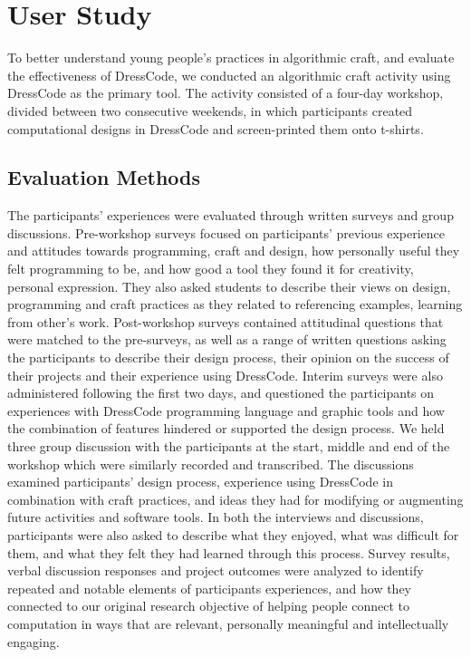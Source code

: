 \documentclass{sigchi}
\begin{document}
\section{User Study}
To better understand young people's practices in algorithmic craft, and evaluate the effectiveness of DressCode, we conducted an algorithmic craft activity using DressCode as the primary tool. The activity consisted of a four-day workshop, divided between two consecutive weekends, in which participants created computational designs in DressCode and screen-printed them onto t-shirts.

\subsection{Evaluation Methods}
The participants' experiences were evaluated through written surveys and group discussions. Pre-workshop surveys focused on participants' previous experience and attitudes towards programming, craft and design, how personally useful they felt programming to be, and how good a tool they found it for creativity, personal expression. They also asked students to describe their views on design, programming and craft practices as they related to referencing examples, learning from other's work. Post-workshop surveys contained attitudinal questions that were matched to the pre-surveys, as well as a range of written questions asking the participants to describe their design process, their opinion on the success of their projects and their experience using DressCode. Interim surveys were also administered following the first two days, and questioned the participants on experiences with DressCode programming language and graphic tools and how the combination of features hindered or supported the design process. We held three group discussion with the participants at the start, middle and end of the workshop which were similarly recorded and transcribed. The discussions examined participants' design process, experience using DressCode in combination with craft practices, and ideas they had for modifying or augmenting future activities and software tools. In both the interviews and discussions, participants were also asked to describe what they enjoyed, what was difficult for them, and what they felt they had learned through this process. Survey results, verbal discussion responses and project outcomes were analyzed to identify repeated and notable elements of participants experiences, and how they connected to our original research objective of helping people connect to computation in ways that are relevant, personally meaningful and intellectually engaging.
\end{document}
